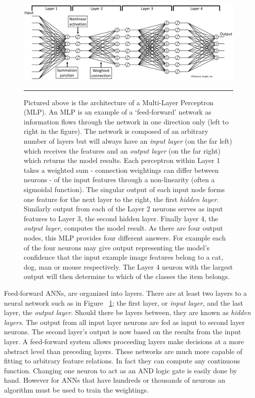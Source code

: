 \begin{figure}[htbp]
	\centering
		\includegraphics[width = 1.0\textwidth]{./Figures/MLP_a_survey_time_travel_in_DL_4.jpg}
		\rule{35em}{0.5pt}
	\caption[Multi-Layer Perceptron]{Pictured above is the architecture of a Multi-Layer Perceptron (MLP). An MLP is an example of a `feed-forward' network as information flows through the network in one direction only (left to right in the figure). The network is composed of an arbitrary number of layers but will always have an \textit{input layer} (on the far left) which receives the features and an \textit{output layer} (on the far right) which returns the model results. Each perceptron within Layer 1 takes a weighted sum - connection weightings can differ between neurons - of the input features through a non-linearity (often a sigmoidal function). The singular output of each input node forms one feature for the next layer to the right, the first \textit{hidden layer}. Similarly output from each of the Layer 2 neurons serves as input features to Layer 3, the second hidden layer. Finally layer 4, the \textit{output layer}, computes the model result. As there are four output nodes, this MLP provides four different answers. For example each of the four neurons may give output representing the model's confidence that the input example image features belong to a cat, dog, man or mouse respectively. The Layer 4 neuron with the largest output will then determine to which of the classes the item belongs. }
	\label{fig:MLP}
\end{figure}
Feed-forward ANNs, are organized into layers.
There are at least two layers to a neural network such as in Figure ~\ref{fig:MLP}; the first layer, or \textit{input layer}, and the last layer, the \textit{output layer}.
Should there be layers between, they are known as \textit{hidden layers}.
The output from all input layer neurons are fed as input to second layer neurons.
The second layer's output is now based on the results from the input layer.
A feed-forward system allows proceeding layers make decisions at a more abstract level than preceding layers\citep{krose1993introduction}.
These networks are much more capable of fitting to arbitrary feature relations.
In fact they can compute any continuous function\citep{hornik1989multilayer}.
Changing one neuron to act as an AND logic gate is easily done by hand.
However for ANNs that have hundreds or thousands of neurons an algorithm must be used to train the weightings.

